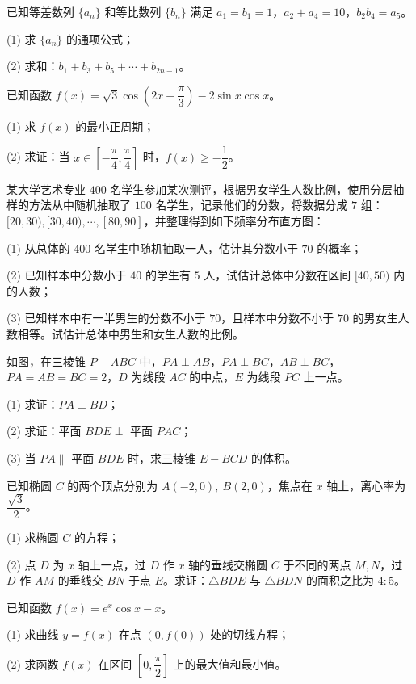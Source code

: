 \begin{question}
已知等差数列 $\{a_n\}$ 和等比数列 $\{b_n\}$ 满足 $a_1=b_1=1$，$a_2+a_4=10$，$b_2b_4=a_5$。

(1)   求 $\{a_n\}$ 的通项公式；

(2)   求和：$b_1+b_3+b_5+\cdots+b_{2n-1}$。

\end{question}
\begin{question}
已知函数 $f(x)=\sqrt3\cos\left(2x-\dfrac\pi3\right)-2\sin x\cos x$。

(1)   求 $f(x)$ 的最小正周期；

(2)   求证：当 $x\in\left[-\dfrac\pi4,\dfrac\pi4\right]$ 时，$f(x)\geqslant-\dfrac12$。

\Needspace{0.4\textheight}
\end{question}
\begin{question}
某大学艺术专业 $400$ 名学生参加某次测评，根据男女学生人数比例，使用分层抽样的方法从中随机抽取了 $100$ 名学生，记录他们的分数，将数据分成 $7$ 组：$[20,30),\allowbreak[30,40),\allowbreak\cdots,\allowbreak[80,90]$，并整理得到如下频率分布直方图：
\nopagebreak[4]
\begin{center}\end{center}
\nopagebreak[4]
(1)   从总体的 $400$ 名学生中随机抽取一人，估计其分数小于 $70$ 的概率；

(2)   已知样本中分数小于 $40$ 的学生有 $5$ 人，试估计总体中分数在区间 $[40,50)$ 内的人数；

(3)   已知样本中有一半男生的分数不小于 $70$，且样本中分数不小于 $70$ 的男女生人数相等。试估计总体中男生和女生人数的比例。

\Needspace{0.4\textheight}
\end{question}
\begin{question}
如图，在三棱锥 $P-ABC$ 中，$PA\perp AB$，$PA\perp BC$，$AB\perp BC$，$PA=AB=BC=2$，$D$ 为线段 $AC$ 的中点，$E$ 为线段 $PC$ 上一点。

(1)   求证：$PA\perp BD$；

(2)   求证：平面 $BDE\perp$ 平面 $PAC$；

(3)   当 $PA\parallel$ 平面 $BDE$ 时，求三棱锥 $E-BCD$ 的体积。
\nopagebreak[4]
\begin{center}\end{center}
\nopagebreak[4]
\end{question}
\begin{question}
已知椭圆 $C$ 的两个顶点分别为 $A(-2,0),\ B(2,0)$，焦点在 $x$ 轴上，离心率为 $\dfrac{\sqrt3}{2}$。

(1)   求椭圆 $C$ 的方程；

(2)   点 $D$ 为 $x$ 轴上一点，过 $D$ 作 $x$ 轴的垂线交椭圆 $C$ 于不同的两点 $M,N$，过 $D$ 作 $AM$ 的垂线交 $BN$ 于点 $E$。求证：$\triangle BDE$ 与 $\triangle BDN$ 的面积之比为 $4:5$。

\end{question}
\begin{question}
已知函数 $f(x)=e^x\cos x-x$。

(1)   求曲线 $y=f(x)$ 在点 $(0,f(0))$ 处的切线方程；

(2)   求函数 $f(x)$ 在区间 $\left[0,\dfrac\pi2\right]$ 上的最大值和最小值。

\end{question}